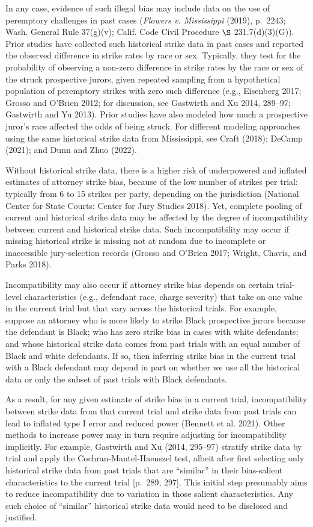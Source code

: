 \documentclass[12pt]{article}
\begin{document}
In any case, evidence of such illegal bias may include data on the use of peremptory challenges in past cases (\emph{Flowers v. Mississippi} (2019), p.~2243; Wash. General Rule 37(g)(v); Calif. Code Civil Procedure \(\S\) 231.7(d)(3)(G)). Prior studies have collected such historical strike data in past cases and reported the observed difference in strike rates by race or sex. Typically, they test for the probability of observing a non-zero difference in strike rates by the race or sex of the struck prospective jurors, given repeated sampling from a hypothetical population of peremptory strikes with zero such difference (e.g., Eisenberg 2017; Grosso and O'Brien 2012; for discussion, see Gastwirth and Xu 2014, 289--97; Gastwirth and Yu 2013). Prior studies have also modeled how much a prospective juror's race affected the odds of being struck. For different modeling approaches using the same historical strike data from Mississippi, see Craft (2018); DeCamp (2021); and Dunn and Zhuo (2022).

Without historical strike data, there is a higher risk of underpowered and inflated estimates of attorney strike bias, because of the low number of strikes per trial: typically from 6 to 15 strikes per party, depending on the jurisdiction (National Center for State Courts: Center for Jury Studies 2018). Yet, complete pooling of current and historical strike data may be affected by the degree of incompatibility between current and historical strike data. Such incompatibility may occur if missing historical strike is missing not at random due to incomplete or inaccessible jury-selection records (Grosso and O'Brien 2017; Wright, Chavis, and Parks 2018).

Incompatibility may also occur if attorney strike bias depends on certain trial-level characteristics (e.g., defendant race, charge severity) that take on one value in the current trial but that vary across the historical trials. For example, suppose an attorney who is more likely to strike Black prospective jurors because the defendant is Black; who has zero strike bias in cases with white defendants; and whose historical strike data comes from past trials with an equal number of Black and white defendants. If so, then inferring strike bias in the current trial with a Black defendant may depend in part on whether we use all the historical data or only the subset of past trials with Black defendants.

As a result, for any given estimate of strike bias in a current trial, incompatibility between strike data from that current trial and strike data from past trials can lead to inflated type I error and reduced power (Bennett et al. 2021). Other methods to increase power may in turn require adjusting for incompatibility implicitly. For example, Gastwirth and Xu (2014, 295--97) stratify strike data by trial and apply the Cochran-Mantel-Haenszel test, albeit after first selecting only historical strike data from past trials that are ``similar'' in their bias-salient characteristics to the current trial {[}p.~289, 297{]}. This initial step presumably aims to reduce incompatibility due to variation in those salient characteristics. Any such choice of ``similar'' historical strike data would need to be disclosed and justified.
\end{document}
